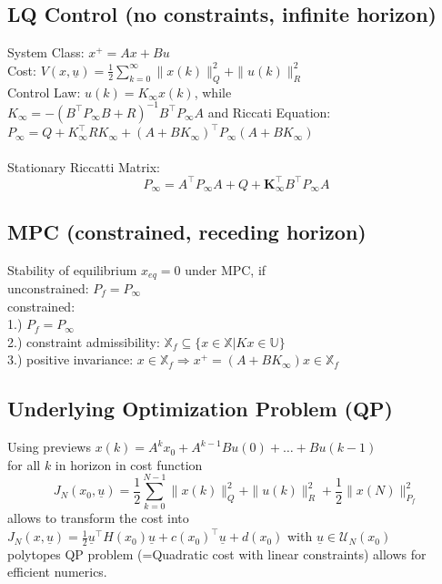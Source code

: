 \documentclass[english]{latex4ei/latex4ei_sheet}
\begin{document}
\begin{sectionbox}
\subsection{LQ Control (no constraints, infinite horizon)}
System Class: $x^{+}=A x+B u$ \\
Cost: $V(x, \underline{u})=\frac{1}{2} \sum\limits_{k=0}^{\infty}\|x(k)\|_{Q}^{2}+\|u(k)\|_{R}^{2}$ \\
Control Law: $u(k)=K_{\infty} x(k)$, while \\ $K_{\infty}=-\left(B^{\top} P_{\infty} B+R\right)^{-1} B^{\top} P_{\infty} A$ and Riccati Equation:\\ 
${P_{\infty}=Q+K_{\infty}^{\top} R K_{\infty}+\left(A+B K_{\infty}\right)^{\top} P_{\infty}\left(A+B K_{\infty}\right)}$\\
\\
Stationary Riccatti Matrix:
$$P_{\infty}=A^{\top} P_{\infty} A+Q+\boldsymbol{K}_{\infty}^{\top}B^{\top} P_{\infty}A$$

\subsection{MPC (constrained, receding horizon)}
Stability of equilibrium $x_{eq}=0$ under MPC, if\\
unconstrained: $P_{f}=P_{\infty}$\\
constrained:\\
1.) $P_{f}=P_{\infty}$ \\
2.) constraint admissibility: $\mathbb{X}_{f} \subseteq\{x \in \mathbb{X} | K x \in \mathbb{U}\}$ \\
3.) positive invariance: $x \in \mathbb{X}_{f} \Rightarrow x^{+}=\left(A+B K_{\infty}\right) x \in \mathbb{X}_{f}$\\

\subsection{Underlying Optimization Problem (QP)}
Using previews $x(k)=A^{k}x_{0}+A^{k-1}Bu(0)+\ldots+Bu(k-1)$\\
for all $k$ in horizon in cost function 
$$J_{N}\left(x_{0}, \underline{u}\right)=\frac{1}{2} \sum\limits_{k=0}^{N-1}\|x(k)\|_{Q}^{2}+\|u(k)\|_{R}^{2}+\frac{1}{2}\|x(N)\|_{P_{f}}^{2}$$
allows to transform the cost into\\ $J_N(x,\underline{u})=\frac{1}{2}\underline{u}^{\top}H(x_0)\underline{u}+c(x_{0})^{\top}\underline{u}+d(x_{0})$ with $\underline{u}\in\mathcal{U}_{N}(x_{0})$\\polytopes QP problem (=Quadratic cost with linear constraints) allows for efficient numerics.

\end{sectionbox}
\end{document}

